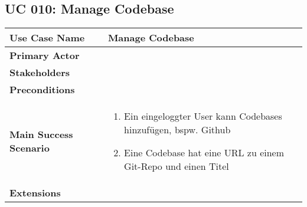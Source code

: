 \subsection{UC 010: Manage Codebase}
\label{uc:010-manage-codebase}

\begin{tabular}{|l|p{}|}
\hline
\textbf{Use Case Name} 	&	Manage Codebase	\\ \hline
\textbf{Primary Actor} 	&		\\ \hline
\textbf{Stakeholders}	&		\\ \hline
\textbf{Preconditions}	&		\\ \hline
\textbf{Main Success Scenario}	&
\begin{enumerate}
	\item Ein eingeloggter User kann Codebases hinzufügen, bspw. Github
	\item Eine Codebase hat eine URL zu einem Git-Repo und einen Titel
\end{enumerate}
\\ \hline
\textbf{Extensions}	& 	\\ \hline
\end{tabular}